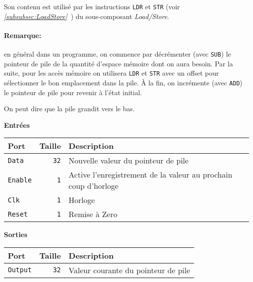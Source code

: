 Son contenu est utilisé par les instructions \texttt{LDR} et \texttt{STR} 
(voir \textit{\ref{subsubsec:LoadStore}~}) du sous-composant \textit{Load/Store}.

\paragraph{Remarque:} en général dans un programme, on commence par décrémenter (avec \texttt{SUB}) le pointeur de pile de la quantité d'espace mémoire dont on aura besoin. Par la suite, pour les accès mémoire on utilisera \texttt{LDR} et \texttt{STR} avec un offset pour sélectionner le bon emplacement dans la pile. À la fin, on incrémente (avec \texttt{ADD}) le pointeur de pile pour revenir à l'état initial.

On peut dire que la pile grandit vers le bas.


\textbf{Entrées}\\

\begin{tabular}{|l|r|l|}
\hline
\textbf{Port}		& \textbf{Taille} & \textbf{Description}\\
\hline

\texttt{Data}		& \texttt{32} & Nouvelle valeur du pointeur de pile\\
\hline
\texttt{Enable}		&  \texttt{1} & Active l'enregistrement de la valeur au prochain coup d'horloge\\
\hline
\texttt{Clk}		&  \texttt{1} & Horloge\\
\hline
\texttt{Reset}		&  \texttt{1} & Remise à Zero\\
\hline


\hline
\end{tabular}

\vspace{1em}
\textbf{Sorties}\\

\begin{tabular}{|l|r|l|}
\hline 
\textbf{Port} & \textbf{Taille} & \textbf{Description}\\
\hline

\hline
\texttt{Output}		& \texttt{32} & Valeur courante du pointeur de pile\\

\hline
\end{tabular}

